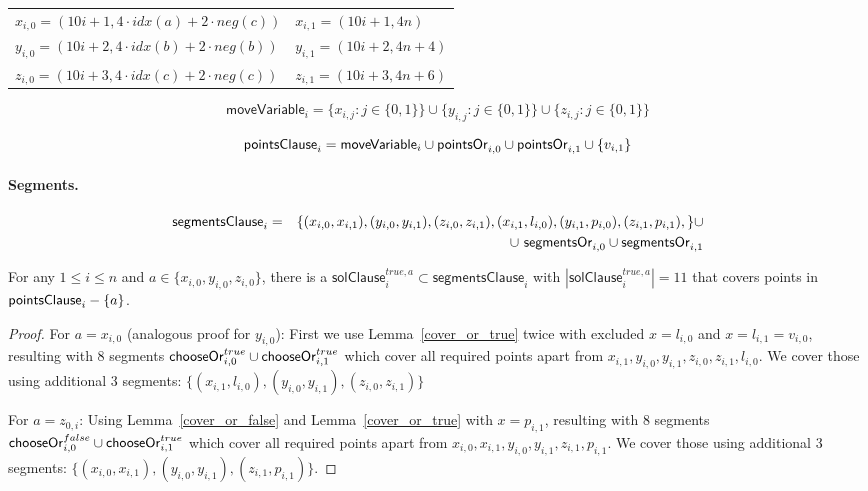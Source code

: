 \begin{center}
\begin{tabular}{ l l }
	$x_{i, 0} = (10i+1, 4\cdot idx(a) + 2\cdot neg(c))$ &
	$x_{i, 1} = (10i+1, 4n)$ \\
	$y_{i, 0} = (10i+2, 4\cdot idx(b) + 2\cdot neg(b))$ &
	$y_{i, 1} = (10i+2, 4n + 4)$ \\
	$z_{i, 0} = (10i+3, 4\cdot idx(c) + 2\cdot neg(c))$ &
	$z_{i, 1} = (10i+3, 4n + 6)$
\end{tabular}
\end{center}

\newcommand{\segmentsClause}{\mathsf{segmentsClause}}	
 
 $$\mathsf{moveVariable}_i = 
 \{x_{i, j} : j \in \{0, 1\}\} \cup
 \{y_{i, j} : j \in \{0, 1\}\} \cup
 \{z_{i, j} : j \in \{0, 1\}\} 
 $$
 
 $$\mathsf{pointsClause}_i = 
 \mathsf{moveVariable}_i \cup \mathsf{pointsOr}_{i,0}
 \cup \mathsf{pointsOr}_{i,1} \cup \{v_{i, 1} \} 
 $$

\paragraph{Segments.}

\begin{eqnarray*}
\segmentsClause_i & = & \{ (x_{i, 0}, x_{i, 1}),
(y_{i, 0}, y_{i, 1}),
(z_{i, 0}, z_{i, 1}),
(x_{i, 1}, l_{i, 0}),
(y_{i, 1}, p_{i, 0}),
(z_{i, 1}, p_{i, 1}),
\} \cup \\
& & \cup \ \segmentsOr{i}{0} \cup \segmentsOr{i}{1}
\end{eqnarray*}

\newcommand{\segmentsClauseSolTrue}[1]{\mathsf{solClause}^{true,#1}}
\newcommand{\segmentsClauseSolFalse}{\mathsf{solClause}^{false}}

\begin{lemma}
\label{cover_clauses_solution_true}
For any $1 \le i \le n$ and $a \in \{ x_{i, 0}, y_{i, 0}, z_{i, 0}\}$,
there is a $\segmentsClauseSolTrue{a}_i \subset \segmentsClause_i$
with $|\segmentsClauseSolTrue{a}_i| = 11$
that covers points in $\mathsf{pointsClause}_i - \{a\}$.
\end{lemma}

\begin{proof}
For $a = x_{i, 0}$ (analogous proof for $y_{i, 0}$):
First we use Lemma~\ref{cover_or_true} twice with excluded $x = l_{i, 0}$ and
$x = l_{i, 1} = v_{i, 0}$,
resulting with 8 segments $\mathsf{chooseOr}^{true}_{i,0} \cup \mathsf{chooseOr}^{true}_{i,1}$
which cover all required points apart from
$x_{i, 1}, y_{i, 0}, y_{i, 1}, z_{i, 0}, z_{i, 1}, l_{i, 0}$.
We cover those using additional 3 segments:
$\{ (x_{i, 1}, l_{i, 0}), (y_{i, 0}, y_{i, 1}),
(z_{i, 0}, z_{i, 1}) \}$

For $a = z_{0, i}$:
Using Lemma~\ref{cover_or_false} and Lemma~\ref{cover_or_true} with
$x = p_{i, 1}$,
resulting with 8 segments $\mathsf{chooseOr}^{false}_{i,0} \cup \mathsf{chooseOr}^{true}_{i,1}$
which cover all required points apart from
$x_{i, 0}, x_{i, 1}, y_{i, 0}, y_{i, 1}, z_{i, 1}, p_{i, 1}$.
We cover those using additional 3 segments:
$\{ (x_{i, 0}, x_{i, 1}), (y_{i, 0}, y_{i, 1}),
(z_{i, 1}, p_{i, 1}) \}$.
\end{proof}


